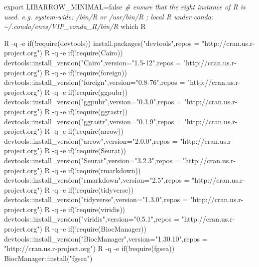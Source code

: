 \documentclass[
]{article}
\newenvironment{Shaded}{\begin{snugshade}}{\end{snugshade}}
\newcommand{\AttributeTok}[1]{\textcolor[rgb]{0.77,0.63,0.00}{#1}}
\newcommand{\BuiltInTok}[1]{#1}
\newcommand{\CommentTok}[1]{\textcolor[rgb]{0.56,0.35,0.01}{\textit{#1}}}
\newcommand{\ExtensionTok}[1]{#1}
\newcommand{\FunctionTok}[1]{\textcolor[rgb]{0.00,0.00,0.00}{#1}}
\newcommand{\NormalTok}[1]{#1}
\newcommand{\StringTok}[1]{\textcolor[rgb]{0.31,0.60,0.02}{#1}}
\newcommand{\VariableTok}[1]{\textcolor[rgb]{0.00,0.00,0.00}{#1}}
\begin{document}
\begin{Shaded}
\begin{Highlighting}[]
\BuiltInTok{export} \VariableTok{LIBARROW\_MINIMAL=}\NormalTok{false}
\CommentTok{\#  ensure that the right instance of R is used. e.g. system{-}wide: /bin/R or /usr/bin/R ; local R under conda: \textasciitilde{}/.conda/envs/VIP\_conda\_R/bin/R}
\FunctionTok{which}\NormalTok{ R}

\ExtensionTok{R} \AttributeTok{{-}q} \AttributeTok{{-}e} \StringTok{\textquotesingle{}if(!require(devtools)) install.packages("devtools",repos = "http://cran.us.r{-}project.org")\textquotesingle{}}
\ExtensionTok{R} \AttributeTok{{-}q} \AttributeTok{{-}e} \StringTok{\textquotesingle{}if(!require(Cairo)) devtools::install\_version("Cairo",version="1.5{-}12",repos = "http://cran.us.r{-}project.org")\textquotesingle{}}
\ExtensionTok{R} \AttributeTok{{-}q} \AttributeTok{{-}e} \StringTok{\textquotesingle{}if(!require(foreign)) devtools::install\_version("foreign",version="0.8{-}76",repos = "http://cran.us.r{-}project.org")\textquotesingle{}}
\ExtensionTok{R} \AttributeTok{{-}q} \AttributeTok{{-}e} \StringTok{\textquotesingle{}if(!require(ggpubr)) devtools::install\_version("ggpubr",version="0.3.0",repos = "http://cran.us.r{-}project.org")\textquotesingle{}}
\ExtensionTok{R} \AttributeTok{{-}q} \AttributeTok{{-}e} \StringTok{\textquotesingle{}if(!require(ggrastr)) devtools::install\_version("ggrastr",version="0.1.9",repos = "http://cran.us.r{-}project.org")\textquotesingle{}}
\ExtensionTok{R} \AttributeTok{{-}q} \AttributeTok{{-}e} \StringTok{\textquotesingle{}if(!require(arrow)) devtools::install\_version("arrow",version="2.0.0",repos = "http://cran.us.r{-}project.org")\textquotesingle{}}
\ExtensionTok{R} \AttributeTok{{-}q} \AttributeTok{{-}e} \StringTok{\textquotesingle{}if(!require(Seurat)) devtools::install\_version("Seurat",version="3.2.3",repos = "http://cran.us.r{-}project.org")\textquotesingle{}}
\ExtensionTok{R} \AttributeTok{{-}q} \AttributeTok{{-}e} \StringTok{\textquotesingle{}if(!require(rmarkdown)) devtools::install\_version("rmarkdown",version="2.5",repos = "http://cran.us.r{-}project.org")\textquotesingle{}}
\ExtensionTok{R} \AttributeTok{{-}q} \AttributeTok{{-}e} \StringTok{\textquotesingle{}if(!require(tidyverse)) devtools::install\_version("tidyverse",version="1.3.0",repos = "http://cran.us.r{-}project.org")\textquotesingle{}}
\ExtensionTok{R} \AttributeTok{{-}q} \AttributeTok{{-}e} \StringTok{\textquotesingle{}if(!require(viridis)) devtools::install\_version("viridis",version="0.5.1",repos = "http://cran.us.r{-}project.org")\textquotesingle{}}
\ExtensionTok{R} \AttributeTok{{-}q} \AttributeTok{{-}e} \StringTok{\textquotesingle{}if(!require(BiocManager)) devtools::install\_version("BiocManager",version="1.30.10",repos = "http://cran.us.r{-}project.org")\textquotesingle{}}
\ExtensionTok{R} \AttributeTok{{-}q} \AttributeTok{{-}e} \StringTok{\textquotesingle{}if(!require(fgsea)) BiocManager::install("fgsea")\textquotesingle{}}


\end{Highlighting}
\end{Shaded}
\end{document}
